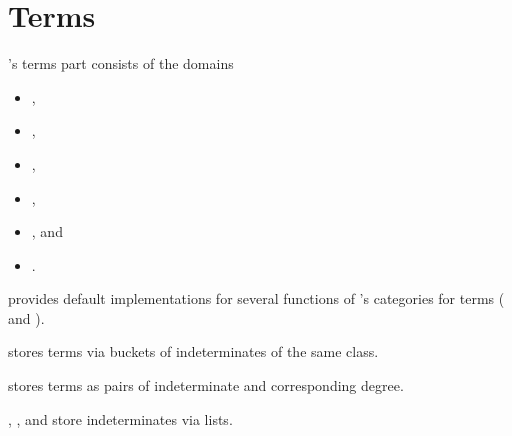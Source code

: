 \clearpage
\section{Terms}


\LibCharSet's terms part consists of the domains

\begin{itemize}
\item {},
\item {},
\item {},
\item {},
\item {}, and
\item {}.
\end{itemize}

 provides default implementations for several functions of \LibAlgebra's categories for terms ( and ).

 stores terms via buckets of indeterminates of the same class.

 stores terms as pairs of indeterminate and corresponding degree.

, , and  store indeterminates via lists.

